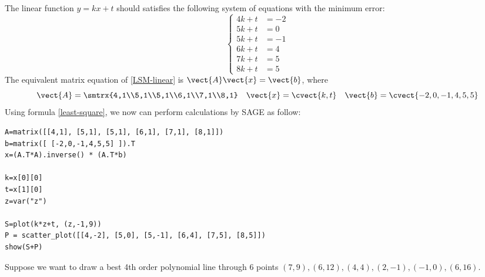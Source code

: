 \begin{solution}
The linear function $y=kx+t$ should satisfies the following system of equations with the minimum error:
\begin{equation}
\label{LSM-linear}
\begin{cases}
4k+t &= -2 \\
5k+t &= 0 \\
5k+t &= -1 \\
6k+t &= 4 \\
7k+t &= 5 \\
8k+t &= 5 
\end{cases}
\end{equation}
The equivalent matrix equation of \eqref{LSM-linear} is $\vect{A}\vect{x}=\vect{b}$, where
\[ \vect{A}=\smtrx{4,1\\5,1\\5,1\\6,1\\7,1\\8,1} \quad \vect{x}=\cvect{k,t} \quad \vect{b}=\cvect{-2,0,-1,4,5,5} \]
Using formula \eqref{least-square}, we now can perform calculations by SAGE as follow:
\begin{verbatim}
A=matrix([[4,1], [5,1], [5,1], [6,1], [7,1], [8,1]])
b=matrix([ [-2,0,-1,4,5,5] ]).T
x=(A.T*A).inverse() * (A.T*b)

k=x[0][0]
t=x[1][0]
z=var("z")

S=plot(k*z+t, (z,-1,9))
P = scatter_plot([[4,-2], [5,0], [5,-1], [6,4], [7,5], [8,5]])
show(S+P)
\end{verbatim}
\end{solution}

\begin{exercise}
Suppose we want to draw a best 4th order polynomial line through 6 points $(7,9),(6,12),(4,4),(2,-1),(-1,0),(6,16)$.%
\end{exercise}

